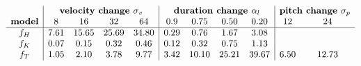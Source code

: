 \[\begin{array}{c|cccc|cccc|cc}
      & \multicolumn{4}{c|}{\textbf{velocity change }\sigma_v} & \multicolumn{4}{c|}{\textbf{duration change }\alpha_l} & \multicolumn{2}{c}{\textbf{pitch change }\sigma_p}\\
      \textbf{model} & 8    & 16   & 32   & 64   & 0.9  & 0.75  & 0.50  & 0.20  & 12   & 24    \\ \hline
      f_H & 7.61 & 15.65 & 25.69 & 34.80 & 0.29 & 0.76 & 1.67 & 3.08 & \multicolumn{2}{c}{} \\
      f_K & 0.07 & 0.15 & 0.32 & 0.46 & 0.12 & 0.32 & 0.75 & 1.13 & \multicolumn{2}{c}{} \\
      f_T & 1.05 & 2.10 & 3.78 & 9.77 & 3.42 & 10.10 & 25.21 & 39.67 & 6.50 & 12.73
\end{array}\]